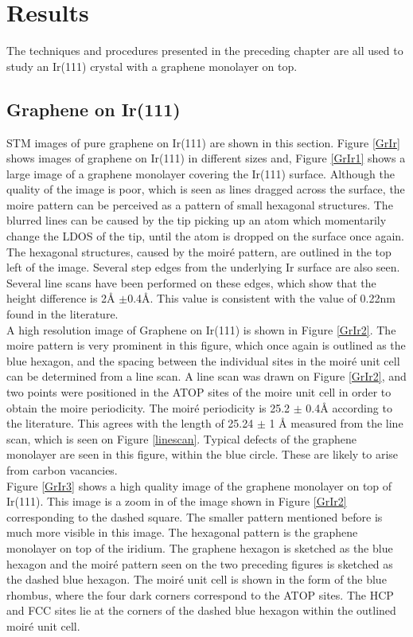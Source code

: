 \chapter{Results}
\label{cha:results}

The techniques and procedures presented in the preceding chapter are all used to study an Ir(111) crystal with a graphene monolayer on top.

\section{Graphene on Ir(111)}

STM images of pure graphene on Ir(111) are shown in this section. Figure \ref{GrIr} shows images of graphene on Ir(111) in different sizes and, Figure \ref{GrIr1} shows a large image of a graphene monolayer covering the Ir(111) surface. Although the quality of the image is poor, which is seen as lines dragged across the surface, the moire pattern can be perceived as a pattern of small hexagonal structures. The blurred lines can be caused by the tip picking up an atom which momentarily change the LDOS of the tip, until the atom is dropped on the surface once again. The hexagonal structures, caused by the moiré pattern, are outlined in the top left of the image. Several step edges from the underlying Ir surface are also seen. Several line scans have been performed on these edges, which show that the height difference is 2Å $\pm$0.4Å. This value is consistent with the value of 0.22nm found in the literature.\cite{1367-2630-11-2-023006,coraux2008structural}\\
A high resolution image of Graphene on Ir(111) is shown in Figure \ref{GrIr2}. The moire pattern is very prominent in this figure, which once again is outlined as the blue hexagon, and the spacing between the individual sites in the moiré unit cell can be determined from a line scan. A line scan was drawn on Figure \ref{GrIr2}, and two points were positioned in the ATOP sites of the moire unit cell in order to obtain the moire periodicity. The moiré periodicity is 25.2 $\pm$ 0.4Å according to the literature.\cite{1367-2630-10-4-043033} This agrees with the length of 25.24 $\pm$ 1 Å measured from the line scan, which is seen on Figure \ref{linescan}. Typical defects of the graphene monolayer are seen in this figure, within the blue circle. These are likely to arise from carbon vacancies.\\
Figure \ref{GrIr3} shows a high quality image of the graphene monolayer on top of Ir(111). This image is a zoom in of the image shown in Figure \ref{GrIr2} corresponding to the dashed square. The smaller pattern mentioned before is much more visible in this image. The hexagonal pattern is the graphene monolayer on top of the iridium. The graphene hexagon is sketched as the blue hexagon and the moiré pattern seen on the two preceding figures is sketched as the dashed blue hexagon. The moiré unit cell is shown in the form of the blue rhombus, where the four dark corners correspond to the ATOP sites. The HCP and FCC sites lie at the corners of the dashed blue hexagon within the outlined moiré unit cell.

